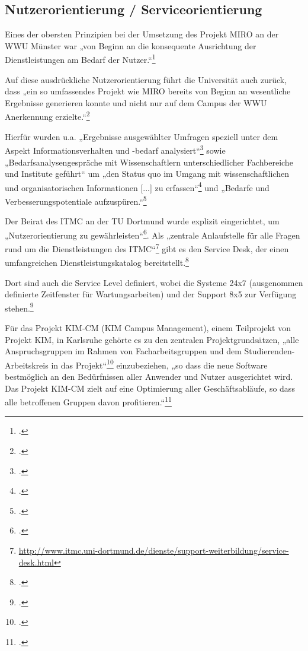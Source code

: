 \subsection{Nutzerorientierung / Serviceorientierung}
Eines der obersten Prinzipien bei der Umsetzung des Projekt MIRO an der WWU Münster war „von Beginn an die konsequente Ausrichtung der Dienstleistungen am Bedarf der Nutzer.“\footcite[19]{vogl_bericht_2013}

Auf diese ausdrückliche Nutzerorientierung führt die Universität auch zurück, dass „ein so umfassendes Projekt wie MIRO bereits von Beginn an wesentliche Ergebnisse generieren konnte und nicht nur auf dem Campus der WWU Anerkennung erzielte.“\footcite[19]{vogl_bericht_2013}

Hierfür wurden u.a. „Ergebnisse ausgewählter Umfragen speziell unter dem Aspekt Informationsverhalten und -bedarf analysiert“\footcite[19]{vogl_bericht_2013} sowie „Bedarfsanalysengespräche mit Wissenschaftlern unterschiedlicher Fachbereiche und Institute geführt“ um „den Status quo im Umgang mit wissenschaftlichen und organisatorischen Informationen [...] zu erfassen“\footcite[19]{vogl_bericht_2013} und „Bedarfe und Verbesserungspotentiale aufzuspüren.“\footcite[20]{vogl_bericht_2013}

Der Beirat des ITMC an der TU Dortmund wurde explizit eingerichtet, um „Nutzerorientierung zu 
gewährleisten“\footcite{tudortmund_itmc_beirat_2013}. Als „zentrale Anlaufstelle für alle Fragen 
rund um die Dienstleistungen des ITMC“\footnote{\url{http://www.itmc.uni-dortmund.de/dienste/support-weiterbildung/service-desk.html}} gibt es 
den Service Desk, der einen umfangreichen Dienstleistungskatalog 
bereitstellt.\footcite{tudortmund_dienstleistungskatalog_2013}

Dort sind auch die Service Level definiert, wobei  die Systeme 24x7 (ausgenommen definierte Zeitfenster für Wartungsarbeiten) und der Support 8x5 zur 
Verfügung 
stehen.\footcite[7]{tudortmund_dienstleistungskatalog_2013}

Für das Projekt KIM-CM (KIM Campus Management), einem Teilprojekt von Projekt KIM, in Karlsruhe gehörte es zu den zentralen Projektgrundsätzen, „alle Anspruchsgruppen im Rahmen von Facharbeitsgruppen und dem Studierenden-Arbeitskreis in das Projekt“\footcite{kit_kim_auswirkungen_2013} einzubeziehen, „so dass die neue Software bestmöglich an den Bedürfnissen aller Anwender und Nutzer ausgerichtet wird. Das Projekt KIM-CM zielt auf eine Optimierung aller Geschäftsabläufe, so dass alle betroffenen Gruppen davon profitieren.“\footcite{kit_kim_auswirkungen_2013}

